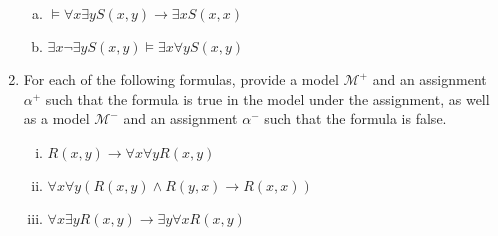 \begin{enumerate}[\thesection.1]
\begin{enumerate}[(a)]
			\item $\vDash \forall x\exists yS(x,y)\to \exists xS(x,x)$

			\item $\exists x\neg\exists yS(x,y)\vDash \exists x\forall yS(x,y)$
		
		\end{enumerate}
		
		\item For each of the following formulas, provide a model $\mathcal{M}^+$ and an assignment $\alpha^+$ such that the formula is true in the model under the assignment, as well as a model $\mathcal{M}^-$ and an assignment $\alpha^-$ such that the formula is false.

\begin{enumerate}[(i)]

\item $R(x,y)\to \forall x\forall yR(x,y)$

\item $\forall x\forall y(R(x,y)\land R(y,x)\to R(x,x))$

\item $\forall x\exists yR(x,y)\to \exists y \forall xR(x,y)$

\end{enumerate}

	
\end{enumerate}

\vfill

\hfill {}



